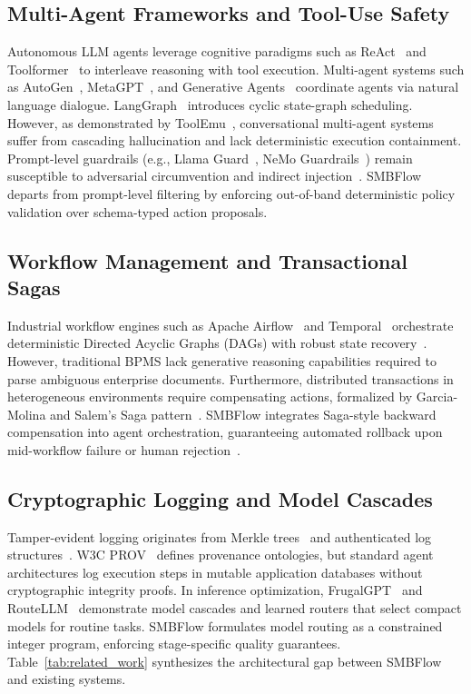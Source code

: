 \documentclass[conference]{IEEEtran}
\begin{document}
\subsection{Multi-Agent Frameworks and Tool-Use Safety}
Autonomous LLM agents leverage cognitive paradigms such as ReAct~\cite{yao2023react} and Toolformer~\cite{schick2023toolformer} to interleave reasoning with tool execution. Multi-agent systems such as AutoGen~\cite{wu2023autogen}, MetaGPT~\cite{hong2024metagpt}, and Generative Agents~\cite{park2023generative} coordinate agents via natural language dialogue. LangGraph~\cite{langgraph2024} introduces cyclic state-graph scheduling. However, as demonstrated by ToolEmu~\cite{ruan2024toolemu}, conversational multi-agent systems suffer from cascading hallucination and lack deterministic execution containment. Prompt-level guardrails (e.g., Llama Guard~\cite{inan2023llamaguard}, NeMo Guardrails~\cite{rebedea2023nemoguardrails}) remain susceptible to adversarial circumvention and indirect injection~\cite{greshake2023promptinjection, robey2023smoothllm}. SMBFlow departs from prompt-level filtering by enforcing out-of-band deterministic policy validation over schema-typed action proposals.

\subsection{Workflow Management and Transactional Sagas}
Industrial workflow engines such as Apache Airflow~\cite{airflow2019} and Temporal~\cite{temporal2022} orchestrate deterministic Directed Acyclic Graphs (DAGs) with robust state recovery~\cite{vanderAalst2016process, weske2019bpm}. However, traditional BPMS lack generative reasoning capabilities required to parse ambiguous enterprise documents. Furthermore, distributed transactions in heterogeneous environments require compensating actions, formalized by Garcia-Molina and Salem's Saga pattern~\cite{garciamolina1987sagas}. SMBFlow integrates Saga-style backward compensation into agent orchestration, guaranteeing automated rollback upon mid-workflow failure or human rejection~\cite{amershi2019guidelines, holzinger2016hitl}.

\subsection{Cryptographic Logging and Model Cascades}
Tamper-evident logging originates from Merkle trees~\cite{merkle1987signature} and authenticated log structures~\cite{crosby2009tamper, laurie2014ct}. W3C PROV~\cite{moreau2013prov} defines provenance ontologies, but standard agent architectures log execution steps in mutable application databases without cryptographic integrity proofs. In inference optimization, FrugalGPT~\cite{chen2023frugalgpt} and RouteLLM~\cite{ong2024routellm} demonstrate model cascades and learned routers that select compact models for routine tasks. SMBFlow formulates model routing as a constrained integer program, enforcing stage-specific quality guarantees. Table~\ref{tab:related_work} synthesizes the architectural gap between SMBFlow and existing systems.
\end{document}
